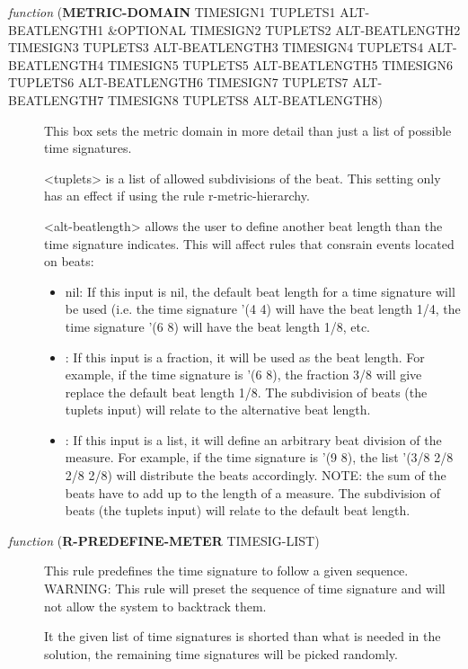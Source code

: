 \begin{description}
\item[{ \emph{function} (\textbf{METRIC-DOMAIN} TIMESIGN1 TUPLETS1 ALT-BEATLENGTH1 \&OPTIONAL TIMESIGN2 TUPLETS2 ALT-BEATLENGTH2 TIMESIGN3 TUPLETS3 ALT-BEATLENGTH3 TIMESIGN4 TUPLETS4 ALT-BEATLENGTH4 TIMESIGN5 TUPLETS5 ALT-BEATLENGTH5 TIMESIGN6 TUPLETS6 ALT-BEATLENGTH6 TIMESIGN7 TUPLETS7 ALT-BEATLENGTH7 TIMESIGN8 TUPLETS8 ALT-BEATLENGTH8)}] This box sets the metric domain in more detail than just a list of possible time signatures.

<tuplets> is a list of allowed subdivisions of the beat. This setting only has an effect if 
using the rule r-metric-hierarchy.

<alt-beatlength> allows the user to define another beat length than the time 
signature indicates. This will affect rules that consrain events located on
beats:
\begin{itemize}
\item nil:  If this input is nil, the default beat length for a time signature 
will be used (i.e. the time signature '(4 4) will have the beat length
1/4, the time signature '(6 8) will have the beat length 1/8, etc.
\item\relax [a fraction]: If this input is a fraction, it will be used as the beat
length. For example, if the time signature is '(6 8), the fraction
3/8 will give replace the default beat length 1/8. The subdivision of 
beats (the tuplets input) will relate to the alternative beat length.
\item\relax [a list]:  If this input is a list, it will define an arbitrary beat
 division of the measure. For example, if the time signature is
'(9 8), the list '(3/8 2/8 2/8 2/8) will distribute the beats
accordingly. NOTE: the sum of the beats have to add up to the length 
of a measure. The subdivision of beats (the tuplets input) will
relate to the default beat length.
\end{itemize}
\end{description}



\begin{description}
\item[{ \emph{function} (\textbf{R-PREDEFINE-METER} TIMESIG-LIST)}] This rule predefines the time signature to follow a given sequence.
WARNING: This rule will preset the sequence of time signature and 
will not allow the system to backtrack them.

It the given list of time signatures is shorted than what is needed 
in the solution, the remaining time signatures will be picked
randomly.
\end{description}



